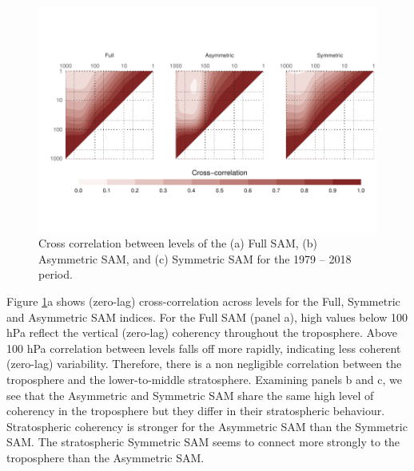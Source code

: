 \documentclass[smallextended]{svjour3}       %
\begin{document}
\begin{figure}
\includegraphics{figures/cross-correlation-1} \caption{Cross correlation between levels of the (a) Full SAM, (b) Asymmetric SAM, and (c) Symmetric SAM for the 1979 -- 2018 period.}\label{fig:cross-correlation}
\end{figure}

Figure \ref{fig:cross-correlation}a shows (zero-lag) cross-correlation across levels for the Full, Symmetric and Asymmetric SAM indices. For the Full SAM (panel a), high values below 100 hPa reflect the vertical (zero-lag) coherency throughout the troposphere. Above 100 hPa correlation between levels falls off more rapidly, indicating less coherent (zero-lag) variability. Therefore, there is a non negligible correlation between the troposphere and the lower-to-middle stratosphere. Examining panels b and c, we see that the Asymmetric and Symmetric SAM share the same high level of coherency in the troposphere but they differ in their stratospheric behaviour. Stratospheric coherency is stronger for the Asymmetric SAM than the Symmetric SAM. The stratospheric Symmetric SAM seems to connect more strongly to the troposphere than the Asymmetric SAM.
\end{document}
